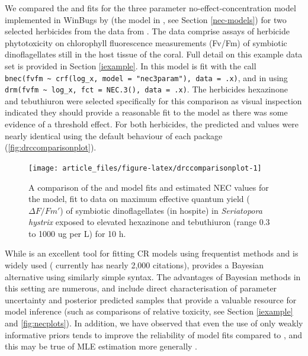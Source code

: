 \documentclass[
  shortnames]{jss}
\begin{document}
We compared the  and  fits for the three parameter no-effect-concentration model implemented in WinBugs by \citet{Fox2010} (the  model in , see Section \ref{nec-models}) for two selected herbicides from the data from \citet{jones2003meps}. The data comprise assays of herbicide phytotoxicity on chlorophyll fluorescence measurements (Fv/Fm) of symbiotic dinoflagellates still in the host tissue of the coral. Full detail on this example data set is provided in Section \ref{iexample}. In  this model is fit with the call \texttt{bnec(fvfm\ \textasciitilde{}\ crf(log\_x,\ model\ =\ "nec3param"),\ data\ =\ .x)}, and in  using \texttt{drm(fvfm\ \textasciitilde{}\ log\_x,\ fct\ =\ NEC.3(),\ data\ =\ .x)}. The herbicides hexazinone and tebuthiuron were selected specifically for this comparison as visual inspection indicated they should provide a reasonable fit to the \citet{Fox2010} model as there was some evidence of a threshold effect. For both herbicides, the predicted  and  values were nearly identical using the default behaviour of each package (\autoref{fig:drccomparisonplot}).

\begin{CodeChunk}
\begin{figure}[!ht]

{\centering \texttt{[image: article\_files/figure-latex/drccomparisonplot-1]} 

}

\caption[A comparison of the  and  model fits and estimated NEC values for the  model, fit to data on maximum effective quantum yield ($\Delta F / Fm'$) of symbiotic dinoflagellates (in hospite) in \textit{Seriatopora hystrix} exposed to elevated hexazinone and tebuthiuron (range 0.3 to 1000 ug per L) for 10 h]{A comparison of the  and  model fits and estimated NEC values for the  model, fit to data on maximum effective quantum yield ($\Delta F / Fm'$) of symbiotic dinoflagellates (in hospite) in \textit{Seriatopora hystrix} exposed to elevated hexazinone and tebuthiuron (range 0.3 to 1000 ug per L) for 10 h.}\label{fig:drccomparisonplot}
\end{figure}
\end{CodeChunk}

While  is an excellent tool for fitting CR models using frequentist methods and is widely used (\citet{Ritz2016} currently has nearly 2,000 citations),  provides a Bayesian alternative using similarly simple syntax. The advantages of Bayesian methods in this setting are numerous, and include direct characterisation of parameter uncertainty and posterior predicted samples that provide a valuable resource for model inference (such as comparisons of relative toxicity, see Section \ref{iexample} and \autoref{fig:necplots}). In addition, we have observed that even the use of only weakly informative priors tends to improve the reliability of model fits compared to , and this may be true of MLE estimation more generally \citep{krull2020comparing}.
\end{document}
